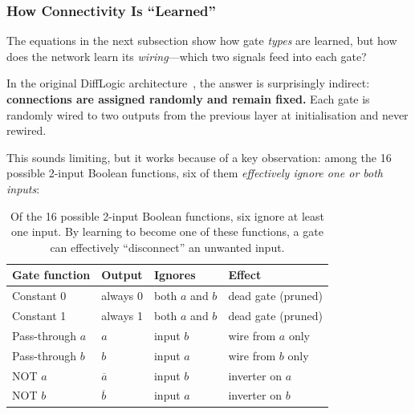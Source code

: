 \subsubsection{How Connectivity Is ``Learned''}
\label{sec:lgn-connectivity}

The equations in the next subsection show how gate \emph{types} are
learned, but how does the network learn its \emph{wiring}---which two
signals feed into each gate?

In the original DiffLogic architecture~\cite{petersen2022difflogic},
the answer is surprisingly indirect: \textbf{connections are assigned
randomly and remain fixed.} Each gate is randomly wired to two outputs
from the previous layer at initialisation and never rewired.

This sounds limiting, but it works because of a key observation:
among the 16 possible 2-input Boolean functions, six of them
\emph{effectively ignore one or both inputs}:

\begin{table}[htbp]
\centering
\caption{Of the 16 possible 2-input Boolean functions, six ignore
  at least one input. By learning to become one of these functions,
  a gate can effectively ``disconnect'' an unwanted input.}
\label{tab:gate-disconnect}
\begin{tabular}{@{}llll@{}}
  \toprule
  \textbf{Gate function} & \textbf{Output} & \textbf{Ignores}
    & \textbf{Effect} \\
  \midrule
  Constant 0  & always 0             & both $a$ and $b$
    & dead gate (pruned) \\
  Constant 1  & always 1             & both $a$ and $b$
    & dead gate (pruned) \\
  Pass-through $a$  & $a$            & input $b$
    & wire from $a$ only \\
  Pass-through $b$  & $b$            & input $a$
    & wire from $b$ only \\
  NOT $a$     & $\overline{a}$       & input $b$
    & inverter on $a$ \\
  NOT $b$     & $\overline{b}$       & input $a$
    & inverter on $b$ \\
  \bottomrule
\end{tabular}
\end{table}

